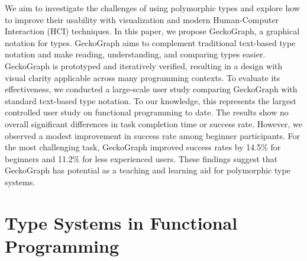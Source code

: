 \documentclass[preprint,12pt]{elsarticle}
\begin{document}
 We aim to investigate the challenges of using polymorphic types and explore how to improve their usability with visualization and modern Human-Computer Interaction (HCI) techniques. In this paper, we propose GeckoGraph, a graphical notation for types. GeckoGraph aims to complement traditional text-based type notation and make reading, understanding, and comparing types easier. GeckoGraph is prototyped and iteratively verified, resulting in a design with visual clarity applicable across many programming contexts. 
 To evaluate its effectiveness, we conducted a large-scale user study comparing GeckoGraph with standard text-based type notation. To our knowledge, this represents the largest controlled user study on functional programming to date.
The results show no overall significant differences in task completion time or success rate. However, we observed a modest improvement in success rate among beginner participants. For the most challenging task, GeckoGraph improved success rates by 14.5\% for beginners and 11.2\% for less experienced users. These findings suggest that GeckoGraph has potential as a teaching and learning aid for polymorphic type systems.


\section{Type Systems in Functional Programming} \label{sec:type-systems}
\end{document}
